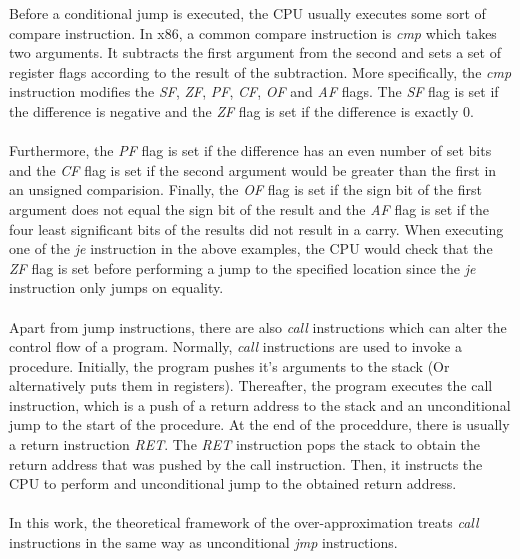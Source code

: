 \documentclass{kththesis}
\begin{document}
Before a conditional jump is executed, the CPU usually executes some sort of compare instruction. In x86, a common compare instruction is \textit{cmp} which takes two arguments. It subtracts the first argument from the second and sets a set of register flags according to the result of the subtraction. More specifically, the \textit{cmp} instruction modifies the \textit{SF}, \textit{ZF}, \textit{PF}, \textit{CF}, \textit{OF} and \textit{AF} flags. The \textit{SF} flag is set if the difference is negative and the \textit{ZF} flag is set if the difference is exactly 0.
\\ \\
Furthermore, the \textit{PF} flag is set if the difference has an even number of set bits and the \textit{CF} flag is set if the second argument would be greater than the first in an unsigned comparision. Finally, the \textit{OF} flag is set if the sign bit of the first argument does not equal the sign bit of the result and the \textit{AF} flag is set if the four least significant bits of the results did not result in a carry. When executing one of the \textit{je} instruction in the above examples, the CPU would check that the \textit{ZF} flag is set before performing a jump to the specified location since the \textit{je} instruction only jumps on equality.
\\ \\
Apart from jump instructions, there are also \textit{call} instructions which can alter the control flow of a program. Normally, \textit{call} instructions are used to invoke a procedure. Initially, the program pushes it's arguments to the stack (Or alternatively puts them in registers). Thereafter, the program executes the call instruction, which is a push of a return address to the stack and an unconditional jump to the start of the procedure. At the end of the proceddure, there is usually a return instruction \textit{RET}. The \textit{RET} instruction pops the stack to obtain the return address that was pushed by the call instruction. Then, it instructs the CPU to perform and unconditional jump to the obtained return address. 
\\ \\ 
In this work, the theoretical framework of the over-approximation treats \textit{call} instructions in the same way as unconditional \textit{jmp} instructions.
\end{document}
